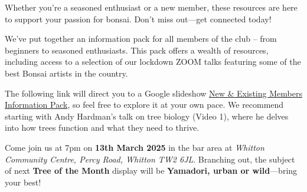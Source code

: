 Whether you're a seasoned enthusiast or a new member, these resources are here to support your passion for bonsai.
Don't miss out---get connected today!

\medskip	
{}
\noindent
We've put together an information pack for all members of the club – from beginners to seasoned enthusiasts.
This pack offers a wealth of resources, including access to a selection of our lockdown ZOOM talks featuring some of the best Bonsai artists in the country.

The following link will direct you to a Google slideshow \href{https://docs.google.com/presentation/d/1L5SRA_ZSvnGMLbRt0CSf-Uz7BaiOfxOs7OUHMM_XrTY/edit?usp=sharing}{New \& Existing Members Information Pack}, so feel free to explore it at your own pace.
We recommend starting with Andy Hardman’s talk on tree biology (Video 1), where he delves into how trees function and what they need to thrive.

\medskip
{}
\noindent
Come join us at 7pm on \textbf{13th March 2025} in the bar area at \emph{Whitton Community Centre, Percy Road, Whitton TW2 6JL}.
Branching out, the subject of next \textbf{Tree of the Month} display will be \textbf{Yamadori, urban or wild}---bring your best!
	
	
\closearticle
\columnbreak
